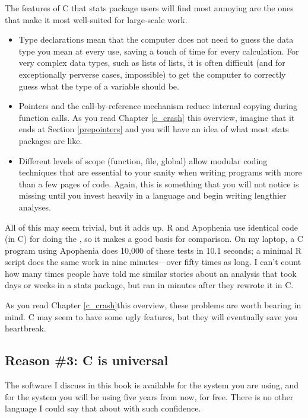 {The features of C that stats package users will find most annoying are
the ones that make it most well-suited for large-scale work. 
\begin{itemize}
\item Type declarations mean that the computer does not need to guess
the data type you mean at every use, saving a touch of time for every
calculation. For very complex data types,
such as lists of lists, it is often difficult (and for exceptionally
perverse cases, impossible) to get the computer to correctly guess what the
type of a variable should be.
\item Pointers and the call-by-reference mechanism reduce internal copying
during function calls.  As you read \ifbook Chapter \ref{c_crash}\else
this overview\fi, imagine that it ends at Section \ref{prepointers}
and you will have an idea of what most stats packages are like.
\item Different levels of scope (function, file, global) allow modular
coding techniques that are essential
to your sanity when writing programs with more than a few pages of
code. Again, this is something that you will not notice is missing until
you invest heavily in a language and begin writing lengthier analyses.
\end{itemize}

All of this may seem trivial, but it adds up. R and Apophenia use
identical code (in C) for doing the , so it makes
a good basis for comparison. On
my laptop, a C program using Apophenia does 10,000 of these tests in
10.1 seconds; a minimal R script does the same work in nine
minutes---over fifty times as long. I can't count how many times people
have told me similar stories about an analysis that took days or weeks
in a stats package, but ran in minutes after they rewrote it in C.

As you read \ifbook Chapter \ref{c_crash}\else this overview\fi, these
problems are worth bearing in mind. C may seem to have some ugly
features, but they will eventually save you heartbreak.

\subsection{Reason \#3: C is universal} 
The software I discuss in this book is available for the system you
are using, and for the system you will be using five years from now,
for free. There is no other language I could say that about with such
confidence.

}

